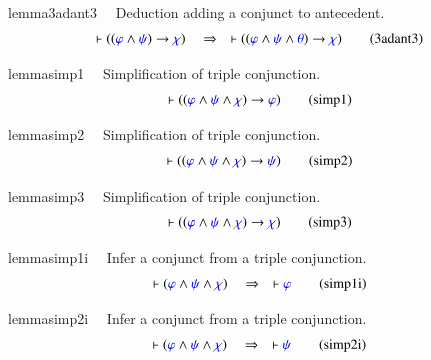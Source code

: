 \begin{restatable}{lemma}{3adant3}~~ Deduction adding a conjunct to antecedent. 
~  ~
\begin{align}
\vdash ( ( \mw{\varphi} \wedge \mw{\psi} ) \rightarrow \mw{\chi}
    )\quad\Rightarrow\quad \vdash ( ( \mw{\varphi} \wedge \mw{\psi} \wedge
    \mw{\theta} ) \rightarrow \mw{\chi} )\label{eq:3adant3}\tag{3adant3}
\end{align}
\end{restatable}

\begin{restatable}{lemma}{simp1}~~ Simplification of triple conjunction. 
~
     ~
\begin{align}
\vdash ( ( \mw{\varphi} \wedge \mw{\psi} \wedge \mw{\chi} ) \rightarrow
    \mw{\varphi} )\label{eq:simp1}\tag{simp1}
\end{align}
\end{restatable}

\begin{restatable}{lemma}{simp2}~~ Simplification of triple conjunction. 
~
     ~
\begin{align}
\vdash ( ( \mw{\varphi} \wedge \mw{\psi} \wedge \mw{\chi} ) \rightarrow
    \mw{\psi} )\label{eq:simp2}\tag{simp2}
\end{align}
\end{restatable}

\begin{restatable}{lemma}{simp3}~~ Simplification of triple conjunction. 
~
     ~
\begin{align}
\vdash ( ( \mw{\varphi} \wedge \mw{\psi} \wedge \mw{\chi} ) \rightarrow
    \mw{\chi} )\label{eq:simp3}\tag{simp3}
\end{align}
\end{restatable}

\begin{restatable}{lemma}{simp1i}~~ Infer a conjunct from a triple conjunction. 
~
\begin{align}
\vdash ( \mw{\varphi} \wedge \mw{\psi} \wedge \mw{\chi} )\quad\Rightarrow\quad
    \vdash \mw{\varphi}\label{eq:simp1i}\tag{simp1i}
\end{align}
\end{restatable}

\begin{restatable}{lemma}{simp2i}~~ Infer a conjunct from a triple conjunction. 
~
\begin{align}
\vdash ( \mw{\varphi} \wedge \mw{\psi} \wedge \mw{\chi} )\quad\Rightarrow\quad
    \vdash \mw{\psi}\label{eq:simp2i}\tag{simp2i}
\end{align}
\end{restatable}

